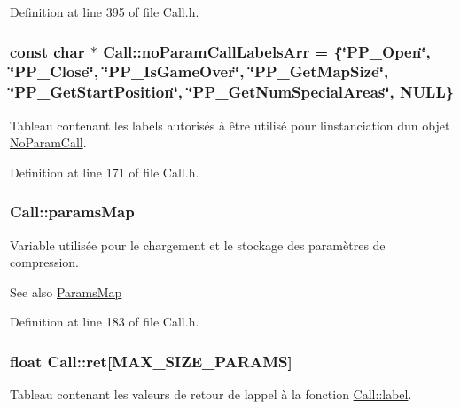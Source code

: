 Definition at line 395 of file Call.\+h.

\subsubsection[{\texorpdfstring{no\+Param\+Call\+Labels\+Arr}{noParamCallLabelsArr}}]{\setlength{\rightskip}{0pt plus 5cm}const char $\ast$ Call\+::no\+Param\+Call\+Labels\+Arr = \{\char`\"{}P\+P\+\_\+\+Open\char`\"{}, \char`\"{}P\+P\+\_\+\+Close\char`\"{}, \char`\"{}P\+P\+\_\+\+Is\+Game\+Over\char`\"{}, \char`\"{}P\+P\+\_\+\+Get\+Map\+Size\char`\"{}, \char`\"{}P\+P\+\_\+\+Get\+Start\+Position\char`\"{}, \char`\"{}P\+P\+\_\+\+Get\+Num\+Special\+Areas\char`\"{}, N\+U\+LL\}\hspace{0.3cm}{\ttfamily [static]}}\hypertarget{class_call_a502f84377bff9a869d6c0349408a8cd1}{}\label{class_call_a502f84377bff9a869d6c0349408a8cd1}
Tableau contenant les labels autorisés à être utilisé pour l\textquotesingle{}instanciation d\textquotesingle{}un objet \hyperlink{class_no_param_call}{No\+Param\+Call}. 

Definition at line 171 of file Call.\+h.

\subsubsection[{\texorpdfstring{params\+Map}{paramsMap}}]{ Call\+::params\+Map\hspace{0.3cm}{\ttfamily [static]}}\hypertarget{class_call_ab91ad28c9446ceec253123d66b23f81c}{}\label{class_call_ab91ad28c9446ceec253123d66b23f81c}
Variable utilisée pour le chargement et le stockage des paramètres de compression.

\begin{DoxySeeAlso}{See also}
\hyperlink{class_params_map}{Params\+Map} 
\end{DoxySeeAlso}


Definition at line 183 of file Call.\+h.

\subsubsection[{\texorpdfstring{ret}{ret}}]{\setlength{\rightskip}{0pt plus 5cm}float Call\+::ret\mbox{[}{\bf M\+A\+X\+\_\+\+S\+I\+Z\+E\+\_\+\+P\+A\+R\+A\+MS}\mbox{]}\hspace{0.3cm}{\ttfamily [protected]}}\hypertarget{class_call_a634f1033a7d282e03578a3d0fd2823f8}{}\label{class_call_a634f1033a7d282e03578a3d0fd2823f8}
Tableau contenant les valeurs de retour de l\textquotesingle{}appel à la fonction \hyperlink{class_call_ad6b8343d530798fdb48407b3f2489ae7}{Call\+::label}. 

